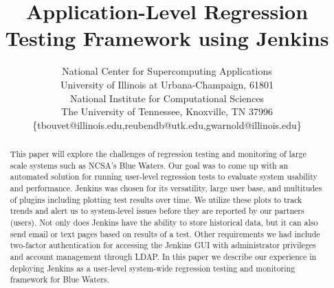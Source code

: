 \documentclass[10pt, conference, compsocconf]{IEEEtran}
\begin{document}
\title{Application-Level Regression Testing Framework using Jenkins}





%
\author{
National Center for Supercomputing Applications\\
University of Illinois at Urbana-Champaign, 61801\\
National Institute for Computational Sciences\\
The University of Tennessee, Knoxville, TN 37996\\
\{tbouvet@illinois.edu,reubendb@utk.edu,gwarnold@illinois.edu\}}





\maketitle
\thispagestyle{plain}

\begin{abstract}
This paper will explore the challenges of regression testing and monitoring of large scale systems such as NCSA’s Blue Waters. Our goal was to come up with an automated solution for running user-level regression tests to evaluate system usability and performance. Jenkins was chosen for its versatility, large user base, and multitudes of plugins including plotting test results over time. We utilize these plots to track trends and alert us to system-level issues before they are reported by our partners (users). Not only does Jenkins have the ability to store historical data, but it can also send email or text pages based on results of a test. Other requirements we had include two-factor authentication for accessing the Jenkins GUI with administrator privileges and account management through LDAP. In this paper we describe our experience in deploying Jenkins as a user-level system-wide regression testing and monitoring framework for Blue Waters.
\end{abstract}
\end{document}
